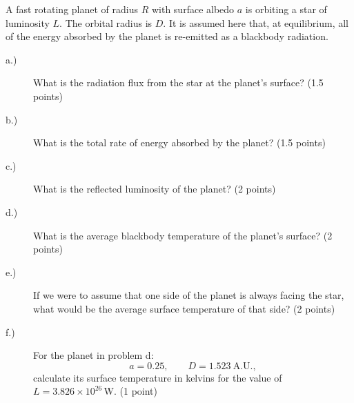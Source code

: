 A fast rotating planet of radius $R$ with surface albedo $a$ is orbiting a star
of luminosity $L$. The orbital radius is $D$. It is assumed here that, at
equilibrium, all of the energy absorbed by the planet is re-emitted as a
blackbody radiation.

\begin{description}
\item[a.)] What is the radiation flux from the star at the planet's surface?
  \hfill(1.5 points)
\item[b.)] What is the total rate of energy absorbed by the planet?
  \hfill(1.5 points)
\item[c.)] What is the reflected luminosity of the planet? \hfill(2 points)
\item[d.)] What is the average blackbody temperature of the planet's surface?
  \hfill(2 points)
\item[e.)] If we were to assume that one side of the planet is always facing
  the star, what would be the average surface temperature of that side?
  \hfill(2 points)
\item[f.)] For the planet in problem d:
  \[ a = 0.25, \qquad D = 1.523\ \mathrm{A.U.}, \]
  calculate its surface temperature in kelvins for the value of
  $L = 3.826 \times 10^{26}$\,W. \hfill(1 point)
\end{description}
